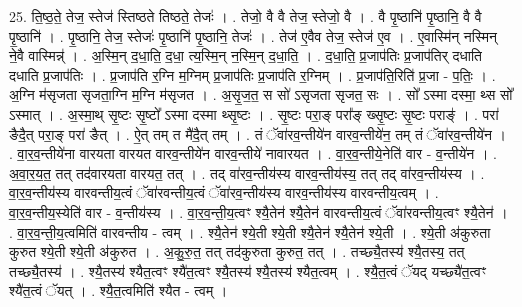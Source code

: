 \documentclass[17pt]{extarticle}
\begin{document}
25. ति॒ष्ठ॒ते॒ तेज॒ स्तेज॑ स्तिष्ठते तिष्ठते॒ तेजः॑ । . तेजो॒ वै वै तेज॒ स्तेजो॒ वै । . वै पृ॒ष्ठानि॑ पृ॒ष्ठानि॒ वै वै पृ॒ष्ठानि॑ । . पृ॒ष्ठानि॒ तेज॒ स्तेजः॑ पृ॒ष्ठानि॑ पृ॒ष्ठानि॒ तेजः॑ । . तेज॑ ए॒वैव तेज॒ स्तेज॑ ए॒व । . ए॒वास्मि॑न् नस्मिन् ने॒वै वास्मिन्न्॑ । . अ॒स्मि॒न् द॒धा॒ति॒ द॒धा॒ त्य॒स्मि॒न् न॒स्मि॒न् द॒धा॒ति॒ । . द॒धा॒ति॒ प्र॒जाप॑तिः प्र॒जाप॑तिर् दधाति दधाति प्र॒जाप॑तिः । . प्र॒जाप॑ति र॒ग्नि म॒ग्निम् प्र॒जाप॑तिः प्र॒जाप॑ति र॒ग्निम् । . प्र॒जाप॑ति॒रिति॑ प्र॒जा - प॒तिः॒ । . अ॒ग्नि म॑सृजता सृजता॒ग्नि म॒ग्नि म॑सृजत । . अ॒सृ॒ज॒त॒ स सो॑ ऽसृजता सृजत॒ सः । . सो᳚ ऽस्मा दस्मा॒ थ्स सो᳚ ऽस्मात् । . अ॒स्मा॒थ् सृ॒ष्टः सृ॒ष्टो᳚ ऽस्मा दस्मा थ्सृ॒ष्टः । . सृ॒ष्टः परा॒ङ् परा᳚ङ् ख्सृ॒ष्टः सृ॒ष्टः पराङ्॑ । . परा॑ ङैदै॒त् परा॒ङ् परा॑ ङैत् । . ऐ॒त् तम् त मै॑दै॒त् तम् । . तं ॅवा॑रव॒न्तीये॑न वारव॒न्तीये॑न॒ तम् तं ॅवा॑रव॒न्तीये॑न । . वा॒र॒व॒न्तीये॑ना वारयता वारयत वारव॒न्तीये॑न वारव॒न्तीये॑ नावारयत । . वा॒र॒व॒न्तीये॒नेति॑ वार - व॒न्तीये॑न । . अ॒वा॒र॒य॒त॒ तत् तद॑वारयता वारयत॒ तत् । . तद् वा॑रव॒न्तीय॑स्य वारव॒न्तीय॑स्य॒ तत् तद् वा॑रव॒न्तीय॑स्य । . वा॒र॒व॒न्तीय॑स्य वारवन्तीय॒त्वं ॅवा॑रवन्तीय॒त्वं ॅवा॑रव॒न्तीय॑स्य वारव॒न्तीय॑स्य वारवन्तीय॒त्वम् । . वा॒र॒व॒न्तीय॒स्येति॑ वार - व॒न्तीय॑स्य । . वा॒र॒व॒न्ती॒य॒त्वꣳ श्यै॒तेन॑ श्यै॒तेन॑ वारवन्तीय॒त्वं ॅवा॑रवन्तीय॒त्वꣳ श्यै॒तेन॑ । . वा॒र॒व॒न्ती॒य॒त्वमिति॑ वारवन्तीय - त्वम् । . श्यै॒तेन॑ श्ये॒ती श्ये॒ती श्यै॒तेन॑ श्यै॒तेन॑ श्ये॒ती । . श्ये॒ती अ॑कुरुता कुरुत श्ये॒ती श्ये॒ती अ॑कुरुत । . अ॒कु॒रु॒त॒ तत् तद॑कुरुता कुरुत॒ तत् । . तच्छ्यै॒तस्य॑ श्यै॒तस्य॒ तत् तच्छ्यै॒तस्य॑ । . श्यै॒तस्य॑ श्यैत॒त्वꣳ श्यै॑त॒त्वꣳ श्यै॒तस्य॑ श्यै॒तस्य॑ श्यैत॒त्वम् । . श्यै॒त॒त्वं ॅयद् यच्छ्यै॑त॒त्वꣳ श्यै॑त॒त्वं ॅयत् । . श्यै॒त॒त्वमिति॑ श्यैत - त्वम् । \newline
\end{document}
